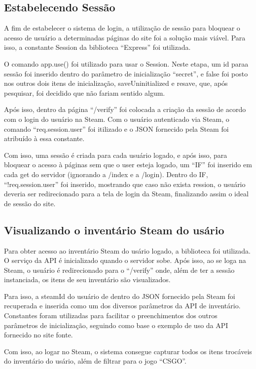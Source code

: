 \subsection{Estabelecendo Sessão}
A fim de estabelecer o sistema de login, a utilização de sessão para bloquear o acesso de usuário a 
determinadas páginas do site foi a solução mais viável. Para isso, a constante Session da biblioteca ``Express'' foi utilizada.

O comando app.use() foi utilizado para usar o Session. Neste etapa, um id paraa sessão foi inserido dentro do 
parâmetro de inicialização ``secret'', e false foi posto nos outros dois itens de inicialização, saveUninitialized e resave, que, 
após pesquisar, foi decidido que não fariam sentido algum.

Após isso, dentro da página ``/verify'' foi colocada a criação da sessão de acordo com o login do usuário na Steam. 
Com o usuário autenticado via Steam, o comando ``req.session.user'' foi itilizado e o JSON fornecido pela Steam 
foi atribuído à essa constante.

Com isso, uma sessão é criada para cada usuário logado, e após isso, para bloquear o acesso à páginas sem que o user 
esteja logado, um ``IF'' foi inserido em cada get do servidor (ignorando a /index e a /login). Dentro do IF, 
``!req.session.user'' foi inserido, mostrando que caso não exista ression, o usuário deveria ser redirecionado para a 
tela de login da Steam, finalizando assim o ideal de sessão do site. 

\subsection{Visualizando o inventário Steam do usário}
Para obter acesso ao inventário Steam do usário logado, a biblioteca  foi utilizada. 
O serviço da API é inicializado quando o servidor sobe. Após isso, ao se loga na Steam, o usuário é redirecionado para o ``/verify'' onde, 
além de ter a sessão instanciada, os itens de seu inventário são visualizados.

Para isso, a steamId do usuário de dentro do JSON fornecido pela Steam foi recuperada e inserida como um dos diversos parâmetros da API de 
inventário. Constantes foram utilizadas para facilitar o preenchimentos dos outros parâmetros de inicialização, seguindo como base o 
exemplo de uso da API fornecido no site fonte.

Com isso, ao logar no Steam, o sistema consegue capturar todos os itens trocáveis do inventário do usário, 
além de filtrar para o jogo ``CSGO''.


